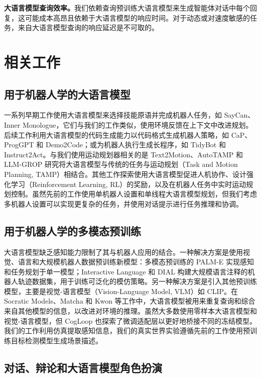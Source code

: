 \documentclass[UTF8, a4paper, 12pt]{article}
\begin{document}
\textbf{大语言模型查询效率。}我们依赖查询预训练大语言模型来生成智能体对话中每个回复，这可能成本高昂且依赖于大语言模型的响应时间。对于动态或对速度敏感的任务，来自大语言模型查询的响应延迟是不可取的。

\section{相关工作}

\subsection{用于机器人学的大语言模型}

一系列早期工作使用大语言模型来选择技能原语并完成机器人任务，如 SayCan、Inner Monologue，它们与我们的工作类似，使用环境反馈在上下文中改进规划。后续工作利用大语言模型的代码生成能力以代码格式生成机器人策略，如 CaP、ProgGPT 和 Demo2Code；或为机器人执行生成长程序，如 TidyBot 和 Instruct2Act。与我们使用运动规划器相关的是 Text2Motion、AutoTAMP 和 LLM-GROP 研究将大语言模型与传统的任务与运动规划（Task and Motion Planning, TAMP）相结合。其他工作探索使用大语言模型促进人机协作、设计强化学习（Reinforcement Learning, RL）的奖励，以及在机器人任务中实时运动规划控制。虽然先前的工作使用单机器人设置和单线程大语言模型规划，但我们考虑多机器人设置可以实现更复杂的任务，并使用对话提示进行任务推理和协调。

\subsection{用于机器人学的多模态预训练}

大语言模型缺乏感知能力限制了其与机器人应用的结合。一种解决方案是使用视觉、语言和大规模机器人数据预训练新模型：多模态预训练的 PALM-E 实现感知和任务规划于单一模型；Interactive Language 和 DIAL 构建大规模语言注释的机器人轨迹数据集，用于训练可泛化的模仿策略。另一种解决方案是引入其他预训练模型，主要是视觉-语言模型（Vision-Language Model, VLM）如 CLIP。在 Socratic Models、Matcha 和 Kwon 等工作中，大语言模型被用来重复查询和综合来自其他模型的信息，以改进对环境的推理。虽然大多数使用零样本大语言模型和视觉-语言模型，但 CogLoop 也探索了微调适配层以更好地桥接不同的冻结模型。我们的工作利用仿真提取感知信息，我们的真实世界实验遵循先前的工作使用预训练目标检测模型生成场景描述。

\subsection{对话、辩论和大语言模型角色扮演}
\end{document}
